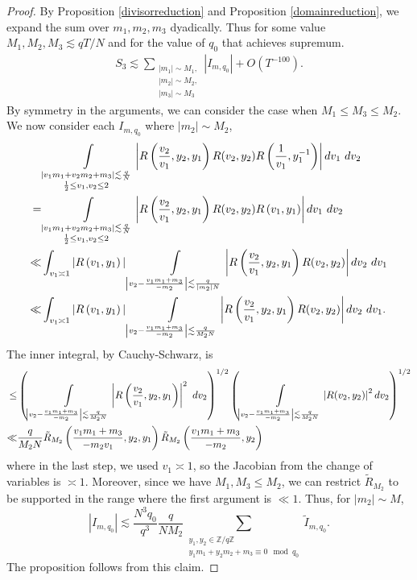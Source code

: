 \begin{proof}
	By Proposition \ref{divisorreduction} and Proposition \ref{domainreduction}, we expand the sum over $m_1,m_2,m_3$ dyadically. Thus for some value $M_1,M_2,M_3 \lesssim qT/N $ and for the value of $q_0$ that achieves supremum. \begin{align*}
		S_3\lesssim \sum_{\substack{|m_1|\sim M_1,\\|m_2|\sim M_2,\\|m_3|\sim M_3}}|I_{m,q_0}| + O(T^{-100}).
	\end{align*}
	By symmetry in the arguments, we can consider the case when $M_1\leq M_3\leq M_2$.
	We now consider each $I_{m,q_0}$ where $|m_2|\sim M_2$,
	\begin{align*} 
		& \int\displaylimits_{\substack{
				|v_1m_1+v_2m_2+m_3|\lesssim \frac{q}{N}\\
				\frac{1}{2}\leq v_1,v_2\leq 2
		}} \left| R\left(\frac{v_2}{v_1},y_2,y_1\right)
		R(v_2,y_2)R\left(\frac{1}{v_1},y_1^{-1}\right)\right| dv_1 \ dv_2\\
		= 
		& \int\displaylimits_{\substack{
				|v_1m_1+v_2m_2+m_3|\lesssim \frac{q}{N}\\
				\frac{1}{2}\leq v_1,v_2\leq 2
		}} \left| R\left(\frac{v_2}{v_1},y_2,y_1\right)
		R(v_2,y_2)R\left(v_1,y_1\right)\right| dv_1 \ dv_2\\
		\ll& 
		\int_{v_1\asymp 1} |R\left(v_1,y_1\right)|
		\int\displaylimits_{\left|v_2 - \frac{v_1m_1+m_3}{-m_2}\right|\lesssim \frac{q}{|m_2|N}} \left| R\left(\frac{v_2}{v_1},y_2,y_1\right)
		R(v_2,y_2)\right|  dv_2 \ dv_1\\
		\ll& \int_{v_1\asymp 1} |R\left(v_1,y_1\right)|
		\int\displaylimits_{\left|v_2 - \frac{v_1m_1+m_3}{-m_2}\right|\lesssim \frac{q}{M_2N}} \left| R\left(\frac{v_2}{v_1},y_2,y_1\right)
		R(v_2,y_2)\right|  dv_2 \ dv_1.\\
	\end{align*} The inner integral, by Cauchy-Schwarz,
	is \begin{align*}
		\leq & \left(\int\displaylimits_{\left|v_2 - \frac{v_1m_1+m_3}{-m_2}\right|\lesssim \frac{q}{M_2N}} \left| R\left(\frac{v_2}{v_1},y_2,y_1\right)\right|^2 \ dv_2 \right)^{1/2}
		\left(
		\int\displaylimits_{\left|v_2 - \frac{v_1m_1+m_3}{-m_2}\right|\lesssim \frac{q}{M_2N}} \left|
		R(v_2,y_2)\right|^2  dv_2\right)^{1/2}\\
		\ll& \frac{q}{M_2N} \tilde{R}_{M_2}\left(\frac{v_1m_1+m_3}{-m_2v_1},y_2,y_1\right)  \tilde{R}_{M_2}\left(\frac{v_1m_1+m_3}{-m_2},y_2\right)
	\end{align*}
	where in the last step, we used $v_1\asymp 1$, so the Jacobian from the change of variables is $\asymp 1$. Moreover, since we have $M_1,M_3\leq M_2$, we can restrict $\tilde{R}_{M_2}$ to be supported in the range
	where the first argument is $\ll 1$.
	Thus, for $|m_2|\sim M$,
	\[
	|I_{m,q_0}|\lesssim \frac{N^3q_0}{q^3} \frac{q}{NM_2}\sum_{\substack{y_1,y_2 \in\mathbb{Z}/q\mathbb{Z} \\ y_1m_1+y_2m_2+m_3\equiv 0 \mod q_0}} \tilde{I}_{m,q_0}.
	\]
	The proposition follows from this claim.
\end{proof}
